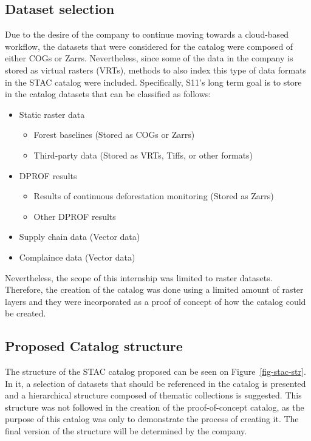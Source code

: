 \documentclass[
  oneside,
  open=any]{scrbook}
\providecommand{\tightlist}{%
  \setlength{\itemsep}{0pt}\setlength{\parskip}{0pt}}\usepackage{longtable,booktabs,array}
\begin{document}
\subsection{Dataset selection}\label{dataset-selection}

Due to the desire of the company to continue moving towards a
cloud-based workflow, the datasets that were considered for the catalog
were composed of either COGs or Zarrs. Nevertheless, since some of the
data in the company is stored as virtual rasters (VRTs), methods to also
index this type of data formats in the STAC catalog were included.
Specifically, S11's long term goal is to store in the catalog datasets
that can be classified as follows:

\begin{itemize}
\tightlist
\item
  Static raster data

  \begin{itemize}
  \tightlist
  \item
    Forest baselines (Stored as COGs or Zarrs)
  \item
    Third-party data (Stored as VRTs, Tiffs, or other formats)
  \end{itemize}
\item
  DPROF results

  \begin{itemize}
  \tightlist
  \item
    Results of continuous deforestation monitoring (Stored as Zarrs)
  \item
    Other DPROF results
  \end{itemize}
\item
  Supply chain data (Vector data)
\item
  Complaince data (Vector data)
\end{itemize}

Nevertheless, the scope of this internship was limited to raster
datasets. Therefore, the creation of the catalog was done using a
limited amount of raster layers and they were incorporated as a proof of
concept of how the catalog could be created.

\subsection{Proposed Catalog
structure}\label{proposed-catalog-structure}

The structure of the STAC catalog proposed can be seen on
Figure~\ref{fig-stac-str}. In it, a selection of datasets that should be
referenced in the catalog is presented and a hierarchical structure
composed of thematic collections is suggested. This structure was not
followed in the creation of the proof-of-concept catalog, as the purpose
of this catalog was only to demonstrate the process of creating it. The
final version of the structure will be determined by the company.
\end{document}
